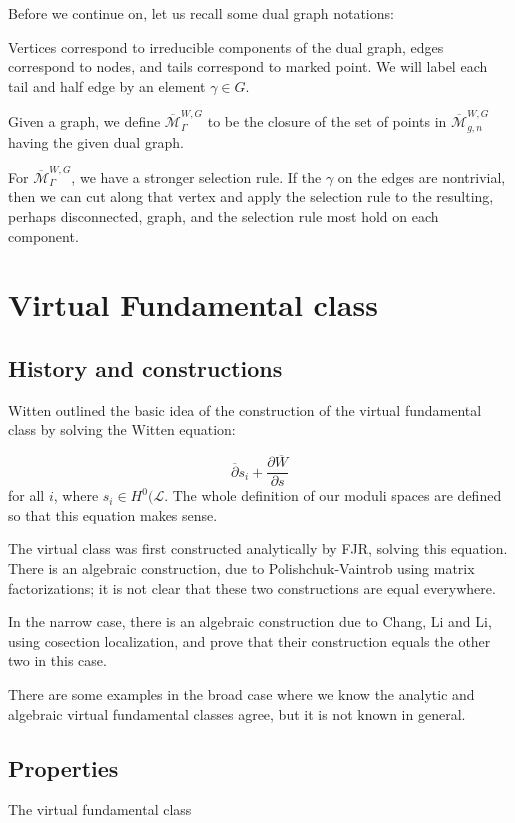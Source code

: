 \documentclass{amsart}
\theoremstyle{definition}
\newcommand{\Mbar}{\overline{\mathcal{M}}}
\begin{document}
Before we continue on, let us recall some dual graph notations:

Vertices correspond to irreducible components of the dual graph, edges correspond to nodes, and tails correspond to marked point.  We will label each tail and half edge by an element $\gamma\in G$.

Given a graph, we define $\Mbar_{\Gamma}^{W,G}$ to be the closure of the set of points in $\Mbar_{g,n}^{W,G}$ having the given dual graph.

For $\Mbar_{\Gamma}^{W,G}$, we have a stronger selection rule.  If the $\gamma$ on the edges are nontrivial, then we can cut along that vertex and apply the selection rule to the resulting, perhaps disconnected, graph, and the selection rule most hold on each component.

\section{Virtual Fundamental class}


\subsection{History and constructions}
Witten outlined the basic idea of the construction of the virtual fundamental class by solving the Witten equation:

$$\overline{\partial} s_i+\frac{\partial\overline{W}}{\partial s}$$
for all $i$, where $s_i\in H^0(\mathcal{L}$.  The whole definition of our moduli spaces are defined so that this equation makes sense.

The virtual class was first constructed analytically by FJR, solving this equation.  There is an algebraic construction, due to Polishchuk-Vaintrob using matrix factorizations; it is not clear that these two constructions are equal everywhere.

In the narrow case, there is an algebraic construction due to Chang, Li and Li, using cosection localization, and prove that their construction equals the other two in this case.

There are some examples in the broad case where we know the analytic and algebraic virtual fundamental classes agree, but it is not known in general.

\subsection{Properties}
The virtual fundamental class
\end{document}
